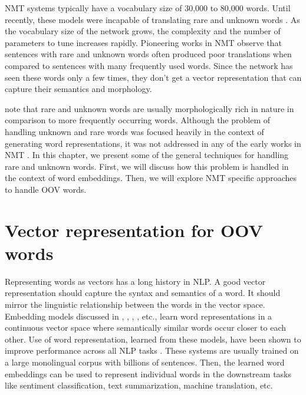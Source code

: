 
NMT systems typically have a vocabulary size of 30,000 to 80,000 words. Until recently, these models were incapable of translating rare and unknown words \citep{luong2015addressing}. As the vocabulary size of the network grows, the complexity and the number of parameters to tune increases rapidly. Pioneering works in NMT  \citep{sutskever2014sequence,bahdanau2014neural} observe that sentences with rare and unknown words often produced poor translations when compared to sentences with many frequently used words. Since the network has seen these words only a few times, they don't get a vector representation that can capture their semantics and morphology. 

\cite{luong2013better} note that rare and unknown words are usually morphologically rich in nature in comparison to more frequently occurring words. Although the problem of handling unknown and rare words was focused heavily in the context of generating word representations, it was not addressed in any of the early works in NMT \citep{luong2015addressing}. 
In this chapter, we present some of the general techniques for handling rare and unknown words. First, we will discuss how this problem is handled in the context of word embeddings. Then, we will explore NMT specific approaches to handle OOV words.


\section{Vector representation for OOV words}

Representing words as vectors has a long history in NLP. A good vector representation should capture the syntax and semantics of a word. It should mirror the linguistic relationship between the words in the vector space. Embedding models discussed in  \cite{bengio2003neural}, \cite{collobert2008unified}, \cite{mikolov2013distributed}, \cite{pennington2014glove}, etc., learn word representations in a continuous vector space where semantically similar words occur closer to each other. Use of word representation, learned from these models, have been shown to improve performance across all NLP tasks \citep{kumar2016ask}. These systems are usually trained on a large monolingual corpus with billions of sentences. Then, the learned word embeddings can be used to represent individual words in the downstream tasks like sentiment classification, text summarization, machine translation, etc.



